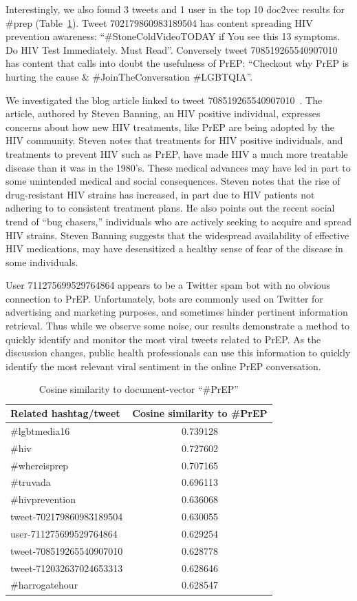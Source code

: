 \documentclass[conference]{IEEEtran}
\begin{document}
Interestingly, we also found 3 tweets and 1 user in the top 10 doc2vec results for \#prep (Table~\ref{tbl:d2v}). Tweet 702179860983189504 has content spreading HIV prevention awareness: ``\#StoneColdVideoTODAY if You see this 13 symptoms. Do HIV Test Immediately. Must Read''. Conversely tweet 708519265540907010 has content that calls into doubt the usefulness of PrEP: ``Checkout why PrEP is hurting the cause \& \#JoinTheConversation \#LGBTQIA''.

We investigated the blog article linked to tweet 708519265540907010~\cite{prephurtingcause}. The article, authored by Steven Banning, an HIV positive individual, expresses concerns about how new HIV treatments, like PrEP are being adopted by the HIV community. Steven notes that treatments for HIV positive individuals, and treatments to prevent HIV such as PrEP, have made HIV a much more treatable disease than it was in the 1980's. These medical advances may have led in part to some unintended medical and social consequences. Steven notes that the rise of drug-resistant HIV strains has increased, in part due to HIV patients not adhering to to consistent treatment plans. He also points out the recent social trend of ``bug chasers,'' individuals who are actively seeking to acquire and spread HIV strains. Steven Banning suggests that the widespread availability of effective HIV medications, may have desensitized a healthy sense of fear of the disease in some individuals.

User 711275699529764864 appears to be a Twitter spam bot with no obvious connection to PrEP. Unfortunately, bots are commonly used on Twitter for advertising and marketing purposes, and sometimes hinder pertinent information retrieval. Thus while we observe some noise, our results demonstrate a method to quickly identify and monitor the most viral tweets related to PrEP. As the discussion changes, public health professionals can use this information to quickly identify the most relevant viral sentiment in the online PrEP conversation.

\begin{table}
\centering
\caption{Cosine similarity to document-vector ``\#PrEP''}
\begin{tabular}{|l|c|} \hline
Related hashtag/tweet & Cosine similarity to \#PrEP\\ \hline
\#lgbtmedia16 & 0.739128\\ \hline
\#hiv & 	0.727602 \\ \hline
\#whereisprep & 0.707165 \\ \hline
\#truvada & 0.696113 \\ \hline
\#hivprevention & 0.636068 \\ \hline
tweet-702179860983189504 & 0.630055\\ \hline
user-711275699529764864 & 0.629254\\ \hline
tweet-708519265540907010 & 0.628778 \\ \hline
tweet-712032637024653313 & 0.628646 \\ \hline
\#harrogatehour & 0.628547 \\ \hline
\hline\end{tabular}
\label{tbl:d2v}
\end{table}
\end{document}
